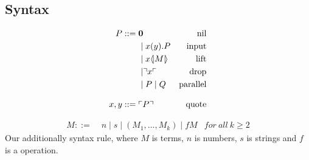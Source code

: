 \subsection{Syntax}
\begin{align*}
P  ::= \; &  \mathbf{0} & \text{nil} \\
  & \mid x(y).P & \text{input} \\
  & \mid x \langle \! | M | \! \rangle & \text{lift} \\
  & \mid \urcorner x \ulcorner & \text{drop} \\
  & \mid P \mid Q & \text{parallel} \\[3mm]
x,y ::= \; & \ulcorner P \urcorner & \text{quote}\\\end{align*}\citep{Meredith2005}

\begin{align*}
M::=\; & n \mid s \mid (M_1,...,M_k) \mid fM &for\ all\ k \geq 2
\end{align*}
Our additionally syntax rule, where $M$ is terms, $n$ is numbers, $s$ is strings and $f$ is a operation.
